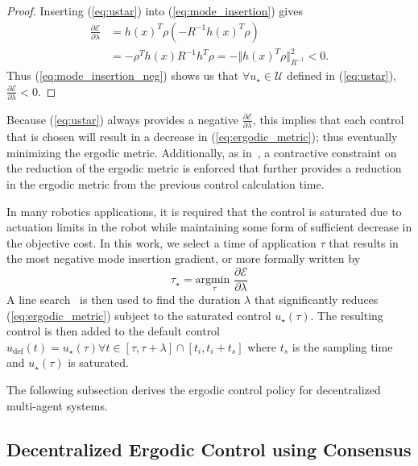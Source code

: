 \documentclass[letterpaper, 10 pt, conference]{ieeeconf}  %
\begin{document}
\begin{proof}
Inserting (\ref{eq:ustar}) into (\ref{eq:mode_insertion}) gives
\begin{align}\label{eq:mode_insertion_neg}
\frac{\partial \mathcal{E}}{\partial \lambda} &= h(x)^T\rho \left(-R^{-1} h(x)^T\rho \right) \nonumber \\
& = -\rho^Th(x)R^{-1}h^T\rho = - \Vert h(x)^T\rho \Vert_{R^{-1}}^2 < 0.
\end{align}
Thus (\ref{eq:mode_insertion_neg}) shows us that $\forall u_\star \in \mathcal{U}$ defined in (\ref{eq:ustar}), $\frac{\partial \mathcal{E}}{\partial \lambda}<0$.
\end{proof}
Because (\ref{eq:ustar}) always provides a negative $\frac{\partial \mathcal{E}}{\partial \lambda}$, this implies that each control that is chosen will result in a decrease in (\ref{eq:ergodic_metric}); thus eventually minimizing the ergodic metric.
Additionally, as in~\cite{mavrommatiTRO2017realTime}, a contractive constraint on the reduction of the ergodic metric is enforced that further provides a reduction in the ergodic metric from the previous control calculation time.

In many robotics applications, it is required that the control is saturated due to actuation limits in the robot while maintaining some form of sufficient decrease in the objective cost. 
In this work, we select a time of application $\tau$ that results in the most negative mode insertion gradient, or more formally written by
\begin{equation*}
\tau_\star= \underset{\tau}{\text{argmin }} \frac{\partial \mathcal{E}}{\partial \lambda}
\end{equation*}
A line search~\cite{armijo1966minimization} is then used to find the duration $\lambda$ that significantly reduces (\ref{eq:ergodic_metric}) subject to the saturated control $u_\star(\tau)$.
The resulting control is then added to the default control $u_\text{def}(t) = u_\star(\tau) \forall t \in \left[ \tau, \tau+\lambda \right] \cap \left[ t_i, t_i+t_s\right]$ where $t_s$ is the sampling time and $u_\star(\tau)$ is saturated.

The following subsection derives the ergodic control policy for decentralized multi-agent systems.

\subsection{Decentralized Ergodic Control using Consensus}
\label{subsec:decentralized-ergodic-control-using-consensus}
\end{document}
